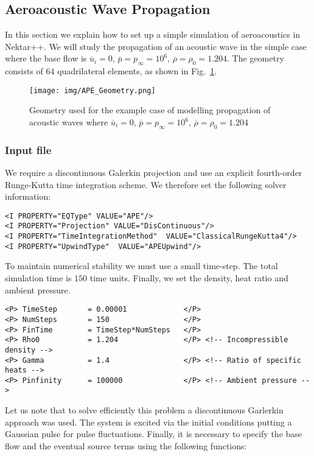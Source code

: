 \subsection{Aeroacoustic Wave Propagation}
In this section we explain how to set up a simple simulation of aeroacoustics in
Nektar++. We will study the propagation of an acoustic wave in the simple case
where the base flow is $\overline{u}_i = 0, \, \overline{p}=p_{\infty}=10^6, \, \overline{\rho} = \rho_0 = 1.204$. The geometry consists
of $64$ quadrilateral elements, as shown in Fig.~\ref{f:acousticsolver:geometry}.

\begin{figure}
	\centering
	\texttt{[image: img/APE\_Geometry.png]}
	\caption{Geometry used for the example case of modelling propagation of
	acoustic waves where $\overline{u}_i = 0, \, \overline{p}=p_{\infty}=10^6, \, \overline{\rho} = \rho_0 = 1.204$}
	\label{f:acousticsolver:geometry}
\end{figure}

\subsubsection{Input file}
We require a discontinuous Galerkin projection and use an explicit
fourth-order Runge-Kutta time integration scheme. We therefore set the following
solver information:
\begin{lstlisting}[style=XmlStyle]
<I PROPERTY="EQType" VALUE="APE"/> 
<I PROPERTY="Projection" VALUE="DisContinuous"/>
<I PROPERTY="TimeIntegrationMethod"  VALUE="ClassicalRungeKutta4"/>
<I PROPERTY="UpwindType"  VALUE="APEUpwind"/>
\end{lstlisting}

To maintain numerical stability we must use a small time-step. The total
simulation time is $150$ time units. Finally, we set the density, heat ratio and
ambient pressure.
\begin{lstlisting}[style=XMLStyle]
<P> TimeStep       = 0.00001             </P>
<P> NumSteps       = 150                 </P>
<P> FinTime        = TimeStep*NumSteps   </P>
<P> Rho0           = 1.204               </P> <!-- Incompressible density -->
<P> Gamma          = 1.4                 </P> <!-- Ratio of specific heats -->
<P> Pinfinity      = 100000              </P> <!-- Ambient pressure -->
\end{lstlisting}

Let us note that to solve efficiently this problem a discontinuous Garlerkin
approach was used. The
system is excited via the initial conditions putting a Gaussian pulse for pulse
fluctuations.  Finally, it is necessary to specify the base flow and the
eventual source terms using the following functions:

